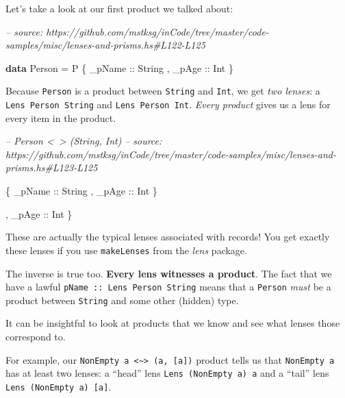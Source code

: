 \documentclass[]{article}
\newenvironment{Shaded}{}{}
\newcommand{\CommentTok}[1]{\textcolor[rgb]{0.38,0.63,0.69}{\textit{#1}}}
\newcommand{\DataTypeTok}[1]{\textcolor[rgb]{0.56,0.13,0.00}{#1}}
\newcommand{\FunctionTok}[1]{\textcolor[rgb]{0.02,0.16,0.49}{#1}}
\newcommand{\KeywordTok}[1]{\textcolor[rgb]{0.00,0.44,0.13}{\textbf{#1}}}
\newcommand{\NormalTok}[1]{#1}
\newcommand{\OtherTok}[1]{\textcolor[rgb]{0.00,0.44,0.13}{#1}}
\begin{document}
Let's take a look at our first product we talked about:

\begin{Shaded}
\begin{Highlighting}[]
\CommentTok{-- source: https://github.com/mstksg/inCode/tree/master/code-samples/misc/lenses-and-prisms.hs#L122-L125}

\KeywordTok{data} \DataTypeTok{Person} \FunctionTok{=} \DataTypeTok{P}
\NormalTok{    \{}\OtherTok{ _pName ::} \DataTypeTok{String}
\NormalTok{    ,}\OtherTok{ _pAge  ::} \DataTypeTok{Int}
\NormalTok{    \}}
\end{Highlighting}
\end{Shaded}

Because \texttt{Person} is a product between \texttt{String} and \texttt{Int},
we get \emph{two lenses}: a \texttt{Lens\textquotesingle{}\ Person\ String} and
\texttt{Lens\textquotesingle{}\ Person\ Int}. \emph{Every product} gives us a
lens for every item in the product.

\begin{Shaded}
\begin{Highlighting}[]
\CommentTok{-- Person <~> (String, Int)}
\CommentTok{-- source: https://github.com/mstksg/inCode/tree/master/code-samples/misc/lenses-and-prisms.hs#L123-L125}

\NormalTok{    \{}\OtherTok{ _pName ::} \DataTypeTok{String}
\NormalTok{    ,}\OtherTok{ _pAge  ::} \DataTypeTok{Int}
\NormalTok{    \}}

\NormalTok{    ,}\OtherTok{ _pAge  ::} \DataTypeTok{Int}
\NormalTok{    \}}
\end{Highlighting}
\end{Shaded}

These are actually the typical lenses associated with records! You get exactly
these lenses if you use \texttt{makeLenses} from the \emph{lens} package.

The inverse is true too. \textbf{Every lens witnesses a product}. The fact that
we have a lawful \texttt{pName\ ::\ Lens\textquotesingle{}\ Person\ String}
means that a \texttt{Person} \emph{must} be a product between \texttt{String}
and some other (hidden) type.

It can be insightful to look at products that we know and see what lenses those
correspond to.

For example, our
\texttt{NonEmpty\ a\ \textless{}\textasciitilde{}\textgreater{}\ (a,\ {[}a{]})}
product tells us that \texttt{NonEmpty\ a} has at least two lenses: a ``head''
lens \texttt{Lens\textquotesingle{}\ (NonEmpty\ a)\ a} and a ``tail'' lens
\texttt{Lens\textquotesingle{}\ (NonEmpty\ a)\ {[}a{]}}.
\end{document}

